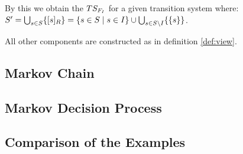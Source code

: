 \documentclass[preview]{standalone}
\begin{document}
By this we obtain the \viewN ${TS_{{{F}}_{I}}}$ for a given transition system \ts where: ${S}' = \bigcup_{{s} \in {S}} \{{{[{s}]_{{R}}}}\} = \{{s} \in {S} \mid {s} \in {I}\}\cup \bigcup_{{s} \in {S} \setminus {I}}\{\{{s}\}\}$.

All other components are constructed as in definition \ref{def:view}.

\subsection{Markov Chain}
\subsection{Markov Decision Process}
\subsection{Comparison of the Examples}
\end{document}

